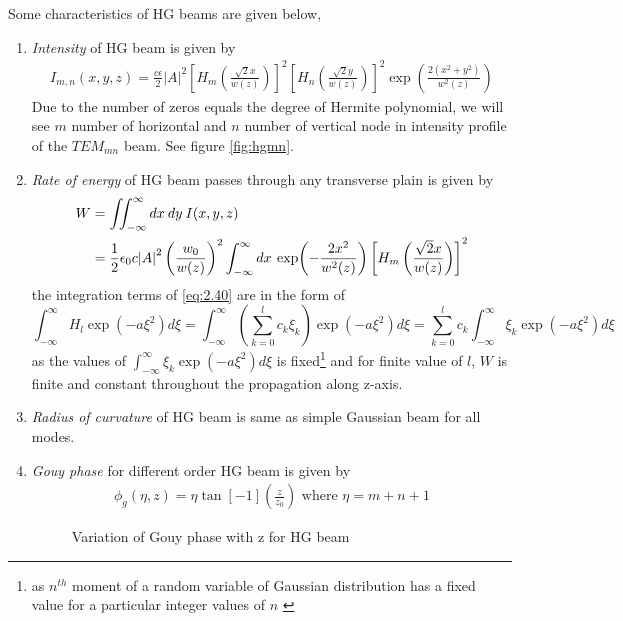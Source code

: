 \documentclass[11pt,a4paper]{article}
\numberwithin{equation}{section}
\begin{document}
Some characteristics of HG beams are given below,
\begin{enumerate}
	\item 
	\textit{Intensity} of HG beam is given by
	\begin{align}
		I_{m,n}(x,y,z)=\frac{c\epsilon}{2} |A|^2 \left[H_m\left(\frac{\sqrt{2} x}{w(z)}\right) \right]^2 \left[H_n\left(\frac{\sqrt{2} y}{w(z)}\right) \right]^2 \exp(\frac{2(x^2+y^2)}{w^2(z)})
	\end{align}
	Due to the number of zeros equals the degree of Hermite polynomial, we will see $m$ number of horizontal and $n$ number of vertical node in intensity profile of the $TEM_{mn}$ beam. See figure \ref{fig:hgmn}.
	
	\item 
	\textit{Rate of energy} of HG beam passes through any transverse plain is given by
	\begin{align}
		W&= \iint_{-\infty}^{\infty} dx\:dy\:I(x,y,z)\nonumber\\
		&= \frac{1}{2} \epsilon_0c \abs{A}^2 \left(\frac{w_0}{w(z)}\right)^2 \int_{-\infty}^{\infty} dx\: \exp(-\frac{2x^2}{w^2(z)}) \left[H_m\left(\frac{\sqrt{2} x}{w(z)}\right) \right]^2\label{eq:2.40}
	\end{align}
	the integration terms of \ref{eq:2.40} are in the form of 
	$$\int_{-\infty}^{\infty} H_l \exp(-a\xi^2) d\xi=
	\int_{-\infty}^{\infty}\left(\sum_{k=0}^l c_k \xi_k\right)  \exp(-a\xi^2) d\xi = 
	\sum_{k=0}^l c_k\int_{-\infty}^{\infty} \xi_k \exp(-a\xi^2) d\xi
	$$
	as the values of $ \int_{-\infty}^{\infty} \xi_k \exp(-a\xi^2) d\xi $ is fixed\footnote{as $n^{th}$ moment of a random variable of Gaussian distribution has a fixed value for a particular integer values of $n$ \cite{n dist}} and for finite value of $l$, $W$ is finite and constant throughout the propagation along z-axis.
	
	
	\item
	\textit{Radius of curvature} of HG beam is same as simple Gaussian beam for all modes.
	
	\item 
	\textit{Gouy phase} for different order HG beam is given by
	\begin{align}
		\phi_g (\eta,z) = \eta \tan[-1](\frac{z}{z_0})\text{ where } \eta = m+n+1
	\end{align}
	
	\begin{figure}[H]
		\centering
		\scalebox{0.7}{}
		\caption{Variation of Gouy phase with z for HG beam}
		\label{fig:gouy_hg}
	\end{figure}
\end{enumerate}
\end{document}
